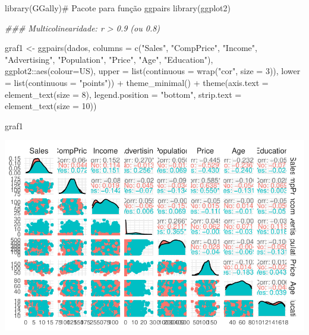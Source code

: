 \documentclass[
  letterpaper,
  DIV=11,
  numbers=noendperiod]{scrartcl}
\newenvironment{Shaded}{\begin{snugshade}}{\end{snugshade}}
\newcommand{\AttributeTok}[1]{\textcolor[rgb]{0.40,0.45,0.13}{#1}}
\newcommand{\CommentTok}[1]{\textcolor[rgb]{0.37,0.37,0.37}{#1}}
\newcommand{\DecValTok}[1]{\textcolor[rgb]{0.68,0.00,0.00}{#1}}
\newcommand{\DocumentationTok}[1]{\textcolor[rgb]{0.37,0.37,0.37}{\textit{#1}}}
\newcommand{\FunctionTok}[1]{\textcolor[rgb]{0.28,0.35,0.67}{#1}}
\newcommand{\NormalTok}[1]{\textcolor[rgb]{0.00,0.23,0.31}{#1}}
\newcommand{\OtherTok}[1]{\textcolor[rgb]{0.00,0.23,0.31}{#1}}
\newcommand{\SpecialCharTok}[1]{\textcolor[rgb]{0.37,0.37,0.37}{#1}}
\newcommand{\StringTok}[1]{\textcolor[rgb]{0.13,0.47,0.30}{#1}}
\begin{document}
\begin{Shaded}
\begin{Highlighting}[]
\FunctionTok{library}\NormalTok{(GGally)}\CommentTok{\# Pacote para função ggpairs}
\FunctionTok{library}\NormalTok{(ggplot2)}


\DocumentationTok{\#\#\# Multicolinearidade: r \textgreater{} 0.9 (ou 0.8)}

\NormalTok{graf1 }\OtherTok{\textless{}{-}} \FunctionTok{ggpairs}\NormalTok{(dados, }
                 \AttributeTok{columns =} \FunctionTok{c}\NormalTok{(}\StringTok{"Sales"}\NormalTok{, }\StringTok{"CompPrice"}\NormalTok{, }\StringTok{"Income"}\NormalTok{, }\StringTok{"Advertising"}\NormalTok{, }\StringTok{"Population"}\NormalTok{, }\StringTok{"Price"}\NormalTok{, }\StringTok{"Age"}\NormalTok{, }\StringTok{"Education"}\NormalTok{), }
\NormalTok{                 ggplot2}\SpecialCharTok{::}\FunctionTok{aes}\NormalTok{(}\AttributeTok{colour=}\NormalTok{US), }
                 \AttributeTok{upper =} \FunctionTok{list}\NormalTok{(}\AttributeTok{continuous =} \FunctionTok{wrap}\NormalTok{(}\StringTok{"cor"}\NormalTok{, }\AttributeTok{size =} \DecValTok{3}\NormalTok{)), }
                 \AttributeTok{lower =} \FunctionTok{list}\NormalTok{(}\AttributeTok{continuous =} \StringTok{"points"}\NormalTok{)) }\SpecialCharTok{+}            
  \FunctionTok{theme\_minimal}\NormalTok{() }\SpecialCharTok{+}                                              
  \FunctionTok{theme}\NormalTok{(}\AttributeTok{axis.text =} \FunctionTok{element\_text}\NormalTok{(}\AttributeTok{size =} \DecValTok{8}\NormalTok{),                      }
        \AttributeTok{legend.position =} \StringTok{"bottom"}\NormalTok{,                              }
        \AttributeTok{strip.text =} \FunctionTok{element\_text}\NormalTok{(}\AttributeTok{size =} \DecValTok{10}\NormalTok{))    }

\NormalTok{graf1}
\end{Highlighting}
\end{Shaded}

\includegraphics{teste_files/figure-pdf/unnamed-chunk-3-1.pdf}
\end{document}
